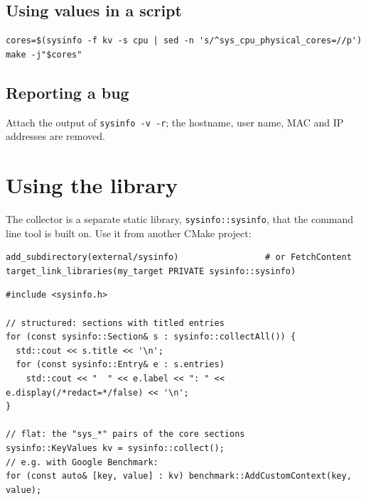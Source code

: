 \documentclass[11pt,a4paper]{article}
\newcommand{\cmd}[1]{\texttt{#1}}
\begin{document}
\subsection{Using values in a script}

\begin{lstlisting}
cores=$(sysinfo -f kv -s cpu | sed -n 's/^sys_cpu_physical_cores=//p')
make -j"$cores"
\end{lstlisting}

\subsection{Reporting a bug}

Attach the output of \cmd{sysinfo -v -r}; the hostname, user name, MAC and IP addresses are removed.

\section{Using the library}
\label{sec:library}

The collector is a separate static library, \texttt{sysinfo::sysinfo}, that the command line tool is built on. Use it from
another CMake project:

\begin{lstlisting}[style=cmake]
add_subdirectory(external/sysinfo)                 # or FetchContent
target_link_libraries(my_target PRIVATE sysinfo::sysinfo)
\end{lstlisting}

\begin{lstlisting}[style=cpp]
#include <sysinfo.h>

// structured: sections with titled entries
for (const sysinfo::Section& s : sysinfo::collectAll()) {
  std::cout << s.title << '\n';
  for (const sysinfo::Entry& e : s.entries)
    std::cout << "  " << e.label << ": " << e.display(/*redact=*/false) << '\n';
}

// flat: the "sys_*" pairs of the core sections
sysinfo::KeyValues kv = sysinfo::collect();
// e.g. with Google Benchmark:
for (const auto& [key, value] : kv) benchmark::AddCustomContext(key, value);
\end{lstlisting}
\end{document}
